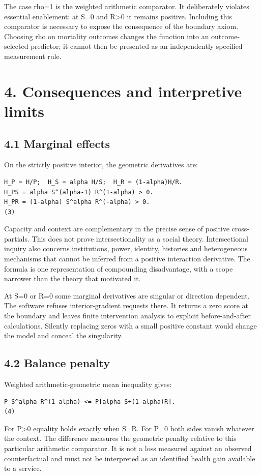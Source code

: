 \documentclass[11pt,a4paper]{article}
\begin{document}
The case rho=1 is the weighted arithmetic comparator. It deliberately violates essential enablement: at S=0 and R\textgreater{}0 it remains positive. Including this comparator is necessary to expose the consequence of the boundary axiom. Choosing rho on mortality outcomes changes the function into an outcome-selected predictor; it cannot then be presented as an independently specified measurement rule.

\section*{4. Consequences and interpretive limits}
\subsection*{4.1 Marginal effects}
On the strictly positive interior, the geometric derivatives are:

{\footnotesize\begin{verbatim}
H_P = H/P;  H_S = alpha H/S;  H_R = (1-alpha)H/R.
H_PS = alpha S^(alpha-1) R^(1-alpha) > 0.
H_PR = (1-alpha) S^alpha R^(-alpha) > 0.                               (3)
\end{verbatim}}
Capacity and context are complementary in the precise sense of positive cross-partials. This does not prove intersectionality as a social theory. Intersectional inquiry also concerns institutions, power, identity, histories and heterogeneous mechanisms that cannot be inferred from a positive interaction derivative. The formula is one representation of compounding disadvantage, with a scope narrower than the theory that motivated it.

At S=0 or R=0 some marginal derivatives are singular or direction dependent. The software refuses interior-gradient requests there. It returns a zero score at the boundary and leaves finite intervention analysis to explicit before-and-after calculations. Silently replacing zeros with a small positive constant would change the model and conceal the singularity.

\subsection*{4.2 Balance penalty}
Weighted arithmetic-geometric mean inequality gives:

{\footnotesize\begin{verbatim}
P S^alpha R^(1-alpha) <= P[alpha S+(1-alpha)R].                         (4)
\end{verbatim}}
For P\textgreater{}0 equality holds exactly when S=R. For P=0 both sides vanish whatever the context. The difference measures the geometric penalty relative to this particular arithmetic comparator. It is not a loss measured against an observed counterfactual and must not be interpreted as an identified health gain available to a service.
\end{document}
